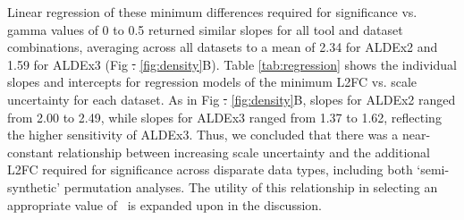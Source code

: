 \documentclass[10pt,letterpaper]{article}
\providecommand{\DIFdeltex}[1]{{\protect\color{red}\sout{#1}}}                      %
\providecommand{\DIFdelbegin}{} %
\providecommand{\DIFdelend}{} %
\providecommand{\DIFdel}[1]{\texorpdfstring{\DIFdeltex{#1}}{}} %
\newcommand{\DIFscaledelfig}{0.5}
\newlength{\DIFdelgraphicswidth} %
\newlength{\DIFdelgraphicsheight} %
\newcommand{\DIFdelincludegraphics}[2][]{%
\sbox{\DIFdelgraphicsbox}{\DIFOincludegraphics[#1]{#2}}%
\settoboxwidth{\DIFdelgraphicswidth}{\DIFdelgraphicsbox} %
\settoboxtotalheight{\DIFdelgraphicsheight}{\DIFdelgraphicsbox} %
\scalebox{\DIFscaledelfig}{%
\parbox[b]{\DIFdelgraphicswidth}{\usebox{\DIFdelgraphicsbox}\\[-\baselineskip] \rule{\DIFdelgraphicswidth}{0em}}\llap{\resizebox{\DIFdelgraphicswidth}{\DIFdelgraphicsheight}{%
\setlength{\unitlength}{\DIFdelgraphicswidth}%
\begin{picture}(1,1)%
\thicklines\linethickness{2pt} %
{\color[rgb]{1,0,0}\put(0,0){\framebox(1,1){}}}%
{\color[rgb]{1,0,0}\put(0,0){\line( 1,1){1}}}%
{\color[rgb]{1,0,0}\put(0,1){\line(1,-1){1}}}%
\end{picture}%
}\hspace*{3pt}}} %
} %
\DeclareRobustCommand{\DIFdelbegin}{\DIFOdelbegin \let\includegraphics\DIFdelincludegraphics} %
\DeclareRobustCommand{\DIFdelend}{\DIFOaddend \let\includegraphics\DIFOincludegraphics} %
\begin{document}
Linear regression of these minimum differences required for significance vs. gamma values of 0 to 0.5 returned similar slopes for all tool and dataset combinations, averaging across all datasets to a mean of 2.34 for ALDEx2 and 1.59 for ALDEx3 (Fig \DIFdelbegin \DIFdel{. }\DIFdelend \ref{fig:density}B). Table \ref{tab:regression} shows the individual slopes and intercepts for regression models of the minimum L2FC vs. scale uncertainty for each dataset. As in Fig \DIFdelbegin \DIFdel{. }\DIFdelend \ref{fig:density}B, slopes for ALDEx2 ranged from 2.00 to 2.49, while slopes for ALDEx3 ranged from 1.37 to 1.62, reflecting the higher sensitivity of ALDEx3. Thus, we concluded that there was a near-constant relationship between increasing scale uncertainty and the additional L2FC required for significance across disparate data types, including both `semi-synthetic' permutation analyses. The utility of this relationship in selecting an appropriate value of \textgamma~is expanded upon in the discussion.
\end{document}
